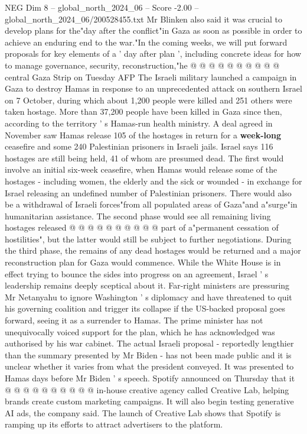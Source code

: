 \begin{textsample}{NEG Dim 8 – global\_north\_2024\_06 – Score -2.00 – global\_north\_2024\_06/200528455.txt}
Mr Blinken also said it was crucial to develop plans for the"day after the conflict"in Gaza as soon as possible in order to achieve an enduring end to the war."In the coming weeks, we will put forward proposals for key elements of a ' day after plan ', including concrete ideas for how to manage governance, security, reconstruction,"he @ @ @ @ @ @ @ @ @ @ central Gaza Strip on Tuesday AFP The Israeli military launched a campaign in Gaza to destroy Hamas in response to an unprecedented attack on southern Israel on 7 October, during which about 1,200 people were killed and 251 others were taken hostage.
More than 37,200 people have been killed in Gaza since then, according to the territory ' s Hamas-run health ministry.
A deal agreed in November saw Hamas release 105 of the hostages in return for a \textbf{week-long} ceasefire and some 240 Palestinian prisoners in Israeli jails.
Israel says 116 hostages are still being held, 41 of whom are presumed dead.
The first would involve an initial six-week ceasefire, when Hamas would release some of the hostages - including women, the elderly and the sick or wounded - in exchange for Israel releasing an undefined number of Palestinian prisoners.
There would also be a withdrawal of Israeli forces"from all populated areas of Gaza"and a"surge"in humanitarian assistance.
The second phase would see all remaining living hostages released @ @ @ @ @ @ @ @ @ @ part of a"permanent cessation of hostilities", but the latter would still be subject to further negotiations.
During the third phase, the remains of any dead hostages would be returned and a major reconstruction plan for Gaza would commence.
While the White House is in effect trying to bounce the sides into progress on an agreement, Israel ' s leadership remains deeply sceptical about it.
Far-right ministers are pressuring Mr Netanyahu to ignore Washington ' s diplomacy and have threatened to quit his governing coalition and trigger its collapse if the US-backed proposal goes forward, seeing it as a surrender to Hamas.
The prime minister has not unequivocally voiced support for the plan, which he has acknowledged was authorised by his war cabinet.
The actual Israeli proposal - reportedly lengthier than the summary presented by Mr Biden - has not been made public and it is unclear whether it varies from what the president conveyed.
It was presented to Hamas days before Mr Biden ' s speech.
Spotify announced on Thursday that it @ @ @ @ @ @ @ @ @ @ in-house creative agency called Creative Lab, helping brands create custom marketing campaigns.
It will also begin testing generative AI ads, the company said.
The launch of Creative Lab shows that Spotify is ramping up its efforts to attract advertisers to the platform.

\end{textsample}

